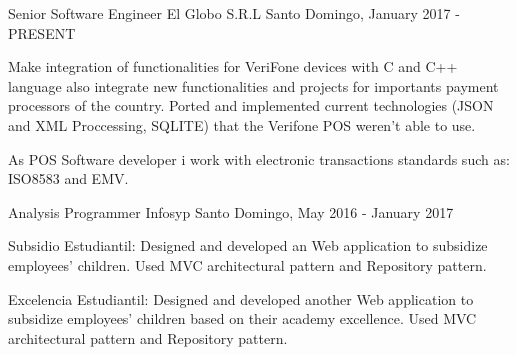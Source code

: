 \begin{cventries}
  \cventry
    {Senior Software Engineer}
    {El Globo S.R.L}
    {Santo Domingo, \mycountry}
    {January 2017 - PRESENT}
    {
      \begin{cvitems}
        \item{Make integration of functionalities for VeriFone devices with C and C++ language also integrate new functionalities and projects for importants payment processors of the country. Ported and implemented current technologies (JSON and XML Proccessing, SQLITE) that the Verifone POS weren't able to use.}
        \item{As POS Software developer i work with electronic transactions standards such as: ISO8583 and EMV.}
      \end{cvitems}
    }
  \cventry
    {Analysis Programmer}
    {Infosyp}
    {Santo Domingo, \mycountry}
    {May 2016 - January 2017}
    {
      \begin{cvitems}
        \item {Subsidio Estudiantil: Designed and developed an Web application to subsidize employees' children. Used MVC architectural pattern and Repository pattern.}
        \item {Excelencia Estudiantil: Designed and developed another Web application to subsidize employees' children based on their academy excellence. Used MVC architectural pattern and Repository pattern.}
      \end{cvitems}
    }
\end{cventries}
